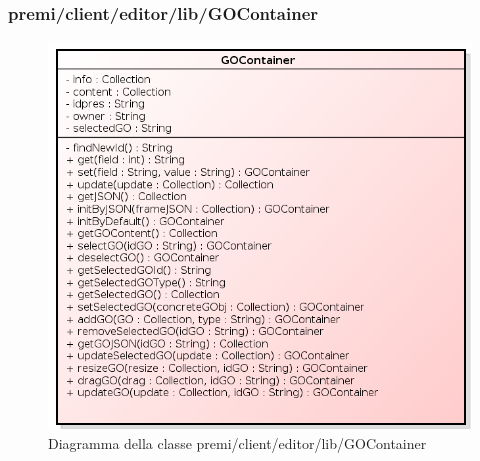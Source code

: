 \subsubsection{premi/client/editor/lib/GOContainer}
\begin{figure}[H]
\begin{center}
\includegraphics[scale=0.80]{img/diacla/GOContainer.png}
\caption{Diagramma della classe premi/client/editor/lib/GOContainer}
\end{center}
\end{figure}

